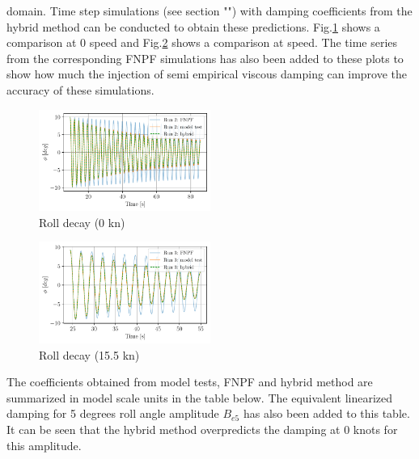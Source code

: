 domain. Time step simulations (see section "") with
damping coefficients from the hybrid method can be conducted to obtain
these predictions. Fig.\ref{fig:hybrid_0_time} shows a
comparison at 0 speed and Fig.\ref{fig:hybrid_speed_time} shows
a comparison at speed. The time series from the corresponding FNPF
simulations has also been added to these plots to show how much the
injection of semi empirical viscous damping can improve the accuracy of
these simulations.
\begin{figure}[H]
\begin{center}\includegraphics[width = 0.5\textwidth]{figures/hybrid_0_time.pdf}\end{center}
\vspace{-1cm}
\caption{Roll decay (0 kn)}
\label{fig:hybrid_0_time}
\end{figure}
\begin{figure}[H]
\begin{center}\includegraphics[width = 0.5\textwidth]{figures/hybrid_speed_time.pdf}\end{center}
\vspace{-1cm}
\caption{Roll decay (15.5 kn)}
\label{fig:hybrid_speed_time}
\end{figure}
The coefficients obtained from model tests, FNPF and hybrid method are
summarized in model scale units in the table below. The equivalent
linearized damping for 5 degrees roll angle amplitude $B_{e5}$ has
also been added to this table. It can be seen that the hybrid method
overpredicts the damping at 0 knots for this amplitude.
